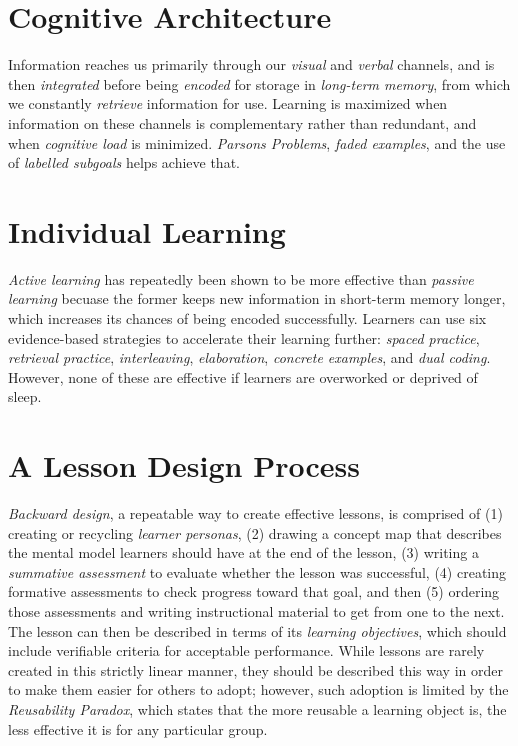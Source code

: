 \documentclass{article}
\begin{document}
\section{Cognitive Architecture}

Information reaches us primarily through our \emph{visual} and \emph{verbal} channels,
and is then \emph{integrated} before being \emph{encoded} for storage in \emph{long-term memory},
from which we constantly \emph{retrieve} information for use.
Learning is maximized when information on these channels is complementary rather than redundant,
and when \emph{cognitive load} is minimized.
\emph{Parsons Problems},
\emph{faded examples},
and the use of \emph{labelled subgoals} helps achieve that.

\section{Individual Learning}

\emph{Active learning} has repeatedly been shown to be more effective than \emph{passive learning}
becuase the former keeps new information in short-term memory longer,
which increases its chances of being encoded successfully.
Learners can use six evidence-based strategies to accelerate their learning further:
\emph{spaced practice},
\emph{retrieval practice},
\emph{interleaving},
\emph{elaboration},
\emph{concrete examples},
and \emph{dual coding}.
However,
none of these are effective if learners are overworked or deprived of sleep.

\section{A Lesson Design Process}

\emph{Backward design},
a repeatable way to create effective lessons,
is comprised of (1) creating or recycling \emph{learner personas},
(2) drawing a concept map that describes the mental model learners should have at the end of the lesson,
(3) writing a \emph{summative assessment} to evaluate whether the lesson was successful,
(4) creating formative assessments to check progress toward that goal,
and then (5) ordering those assessments and writing instructional material to get from one to the next.
The lesson can then be described in terms of its \emph{learning objectives},
which should include verifiable criteria for acceptable performance.
While lessons are rarely created in this strictly linear manner,
they should be described this way in order to make them easier for others to adopt;
however,
such adoption is limited by the \emph{Reusability Paradox},
which states that the more reusable a learning object is,
the less effective it is for any particular group.
\end{document}
